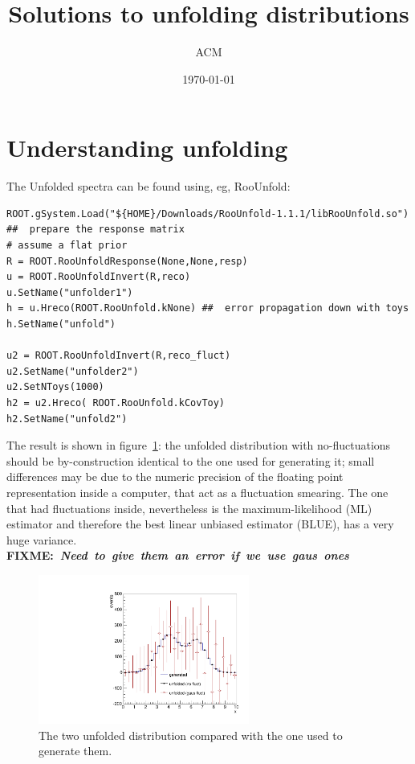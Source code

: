 \documentclass[a4paper,11pt]{article}
\title{Solutions to unfolding distributions}
\author{ACM}
\date{\today}
\newcommand{\fixme}[1]{ \mbox{\bf{FIXME:} \it{#1}} }
\begin{document}
\maketitle

\section{Understanding unfolding}

The Unfolded spectra can be found using, eg, RooUnfold:
\begin{verbatim}
ROOT.gSystem.Load("${HOME}/Downloads/RooUnfold-1.1.1/libRooUnfold.so")
##  prepare the response matrix
# assume a flat prior
R = ROOT.RooUnfoldResponse(None,None,resp)
u = ROOT.RooUnfoldInvert(R,reco)
u.SetName("unfolder1")
h = u.Hreco(ROOT.RooUnfold.kNone) ##  error propagation down with toys
h.SetName("unfold")

u2 = ROOT.RooUnfoldInvert(R,reco_fluct)
u2.SetName("unfolder2")
u2.SetNToys(1000)
h2 = u2.Hreco( ROOT.RooUnfold.kCovToy)
h2.SetName("unfold2")

\end{verbatim}

The result is shown in figure~\ref{fig:sol1}: the unfolded distribution with no-fluctuations should be by-construction identical to the one used for generating it; 
small differences may be due to the numeric precision of the floating point representation inside a computer, that act as a fluctuation smearing. 
The one that had fluctuations inside, nevertheless is the maximum-likelihood (ML) estimator and therefore the best linear unbiased estimator (BLUE), has a very huge variance.
\fixme{Need to give them an error if we use gaus ones}

\begin{figure}[H]
	\centering
	\includegraphics[width=0.618\textwidth]{figs/gen-unfold.pdf}
	\caption{ \label{fig:sol1} The two unfolded distribution compared with the one used to generate them.}
\end{figure}

\FloatBarrier
\end{document}
